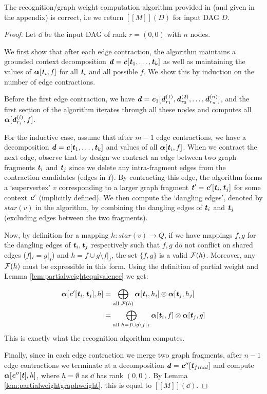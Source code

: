 \documentclass[11pt]{article}
\begin{document}
\begin{theorem}
  The recognition/graph weight computation algorithm provided in
  \cite{chiang2018weighted} (and given in the appendix) is correct, i.e we
  return $[[M]](D)$ for input DAG $D$. 
\end{theorem}
\begin{proof}
  Let $\dd$ be the input DAG of rank $r = (0,0)$ with $n$ nodes. 

  We first show that after each edge contraction, the algorithm maintains a
  grounded context decomposition $\dd = \cc[\tt_1, \ldots, \tt_k]$ as well as
  maintaining the values of $\aalpha[\tt_i, f]$ for all $\tt_i$ and all possible
  $f$. We show this by induction on the number of edge contractions.

  Before the first edge contraction, we have $\dd = \cc_1[\dd^{(1)}_{r_1},
  \dd^{(2)}_{r_2},\ldots, \dd^{(n)}_{r_n}]$, and the first section of the
  algorithm iterates through all these nodes and computes all
  $\aalpha[\dd^{(i)}_{r_i}, f]$. 

  For the inductive case, assume that after $m-1$ edge contractions, we have a
  decomposition $\dd = \cc[\tt_1, \ldots, \tt_k]$ and values of all
  $\aalpha[\tt_i, f]$. When we contract the next edge, observe that by design we
  contract an edge between two graph fragments $\tt_i$ and $\tt_j$ since we
  delete any intra-fragment edges from the contraction candidates (edges in
  $I$). By contracting this edge, the algorithm forms a `supervertex' $v$
  corresponding to a larger graph fragment $\tt' = \cc'[\tt_i, \tt_j]$ for some
  context $\cc'$ (implicitly defined). We then compute the `dangling edges',
  denoted by $star(v)$ in the algorithm, by combining the dangling edges of
  $\tt_i$ and $\tt_j$ (excluding edges between the two fragments). 

  Now, by definition for a mapping $h: star(v) \rightarrow Q$, if we have
  mappings $f,g$ for the dangling edges of $\tt_i,\tt_j$ respectively such that
  $f,g$ do not conflict on shared edges ($f|_I = g|_I$) and $h = f \cup g
  \setminus f|_I$, the set $\{f,g\}$ is a valid $\calF(h)$. Moreover, any
  $\calF(h)$ must be expressible in this form. Using the definition of partial
  weight and Lemma \ref{lem:partialweightequivalence} we get:

  \begin{align*}
    \aalpha[\cc'[\tt_i, \tt_j],h] &= \bigoplus_{\text{all }\calF(h)} \aalpha[\tt_i, h_i] \otimes \aalpha[\tt_j, h_j]\\
    &= \bigoplus_{\text{all }h = f \cup g \setminus f|_I} \aalpha[\tt_i, f] \otimes \aalpha[\tt_j, g]
  \end{align*}
  This is exactly what the recognition algorithm computes. 

  Finally, since in each edge contraction we merge two graph fragments, after
  $n-1$ edge contractions we terminate at a decomposition $\dd =
  \cc''[\tt_{final}]$ and compute $\aalpha[\cc''[\tt],h]$, where $h = \emptyset$
  as $\dd$ has rank $(0,0)$. By Lemma \ref{lem:partialweightgraphweight}, this
  is equal to $[[M]](\dd)$. 
\end{proof}
\end{document}
